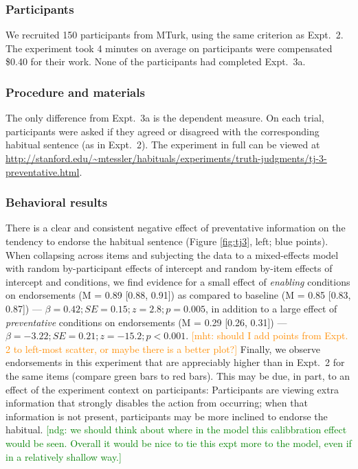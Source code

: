 \documentclass[10pt,letterpaper]{article}
\newcommand{\ndg}[1]{\textcolor{Green}{[ndg: #1]}}
\newcommand{\mht}[1]{\textcolor{DarkOrange}{[mht: #1]}}
\begin{document}
\subsubsection{Participants} 

We recruited 150 participants from MTurk, using the same criterion as Expt.~2.
The experiment took 4 minutes on average on participants were compensated \$0.40 for their work.
None of the participants had completed Expt.~3a.

\subsubsection{Procedure and materials}

The only difference from Expt.~3a is the dependent measure. 
On each trial, participants were asked if they agreed or disagreed with the corresponding habitual sentence (as in Expt.~2).
The experiment in full can be viewed at \url{http://stanford.edu/~mtessler/habituals/experiments/truth-judgments/tj-3-preventative.html}.


\subsubsection{Behavioral results}

There is a clear and consistent negative effect of preventative information on the tendency to endorse the habitual sentence (Figure \ref{fig:tj3}, left; blue points).
When collapsing across items and subjecting the data to a mixed-effects model with random by-participant effects of intercept and random by-item effects of intercept and conditions, we find evidence for a small effect of \emph{enabling} conditions on endorsements (M =  0.89 [0.88, 0.91]) as compared to baseline (M = 0.85 [0.83, 0.87]) --- $\beta = 0.42; SE = 0.15; z = 2.8; p = 0.005$, in addition to a large effect of \emph{preventative} conditions on endorsements (M = 0.29 [0.26, 0.31]) --- $\beta = -3.22; SE = 0.21; z = -15.2; p < 0.001$. 
\mht{should I add points from Expt. 2 to left-most scatter, or maybe there is a better plot?}
Finally, we observe endorsements in this experiment that are appreciably higher than in Expt.~2 for the same items (compare green bars to red bars).
This may be due, in part, to an effect of the experiment context on participants: Participants are viewing extra information that strongly disables the action from occurring; when that information is not present, participants may be more inclined to endorse the habitual.
\ndg{we should think about where in the model this calibbration effect would be seen. Overall it would be nice to tie this expt more to the model, even if in a relatively shallow way.}
\end{document}

